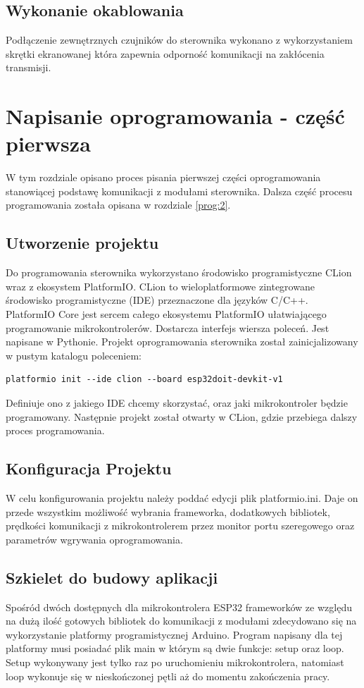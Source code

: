 \documentclass[11pt]{report}
\begin{document}
 
 \section{Wykonanie okablowania}
 Podłączenie zewnętrznych czujników do sterownika wykonano z wykorzystaniem skrętki ekranowanej która zapewnia odporność komunikacji na zakłócenia transmisji.
 
 
 \chapter{Napisanie oprogramowania - część pierwsza}
 W tym rozdziale opisano proces pisania pierwszej części oprogramowania stanowiącej podstawę komunikacji z modułami sterownika. Dalsza część procesu programowania została opisana w rozdziale \ref{prog:2}.
 
 \section{Utworzenie projektu}
 Do programowania sterownika wykorzystano środowisko programistyczne CLion wraz z ekosystem PlatformIO.
 CLion to wieloplatformowe zintegrowane środowisko programistyczne (IDE) przeznaczone dla języków C/C++.
 PlatformIO Core jest sercem całego ekosystemu PlatformIO ułatwiającego programowanie mikrokontrolerów. Dostarcza interfejs wiersza poleceń. Jest napisane w Pythonie.
 Projekt oprogramowania sterownika został zainicjalizowany w pustym katalogu poleceniem:
 \begin{lstlisting}
platformio init --ide clion --board esp32doit-devkit-v1 
 \end{lstlisting}
 Definiuje ono z jakiego IDE chcemy skorzystać, oraz jaki mikrokontroler będzie programowany.
 Następnie projekt został otwarty w CLion, gdzie przebiega dalszy proces programowania.
 
 \section{Konfiguracja Projektu}
 W celu konfigurowania projektu należy poddać edycji plik platformio.ini. Daje on przede wszystkim możliwość wybrania frameworka, dodatkowych bibliotek, prędkości komunikacji z mikrokontrolerem przez monitor portu szeregowego oraz parametrów wgrywania oprogramowania.
 
 \section{Szkielet do budowy aplikacji}
 Spośród dwóch dostępnych dla mikrokontrolera ESP32 frameworków ze względu na dużą ilość gotowych bibliotek do komunikacji z modułami zdecydowano się na wykorzystanie platformy programistycznej Arduino.
 Program napisany dla tej platformy musi posiadać plik main w którym są dwie funkcje: setup oraz loop.
 Setup wykonywany jest tylko raz po uruchomieniu mikrokontrolera, natomiast loop wykonuje się w nieskończonej pętli aż do momentu zakończenia pracy.
 
\end{document}
